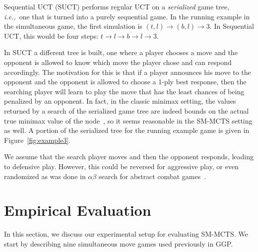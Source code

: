 \documentclass[conference]{IEEEtran}
\newcommand{\ie}{{\it i.e.,}~}
\begin{document}
Sequential UCT (SUCT) performs regular UCT on a {\it serialized} game tree, \ie one that is turned into a 
purely sequential game. 
In the running example in the simultaneous game, the first simulation is $(t,l) \rightarrow (b,l) \rightarrow 3$. 
In Sequential UCT, this would be four steps: $t \rightarrow l \rightarrow b \rightarrow l \rightarrow 3$. 

In SUCT a different tree is built, one where a player chooses a move and the opponent is 
allowed to know which move the player chose and can respond accordingly. 
The motivation for this is that if a player
announces his move to the opponent and the opponent is allowed to choose a 1-ply best response, then the searching player
will learn to play the move that has the least chances of being penalized by an opponent. In fact, in the classic 
minimax setting, the values returned by a search of the serialized game tree are indeed bounds on the actual true 
minimax value of the node~\cite[Corollary 4.2]{Bosansky13Using}, so it seems reasonable in the SM-MCTS setting as well. 
A portion of the serialized tree for the running example game is given in Figure~\ref{fig:example3}. 

We assume that the search player moves and then the opponent responds, leading to 
defensive play. However, this could be reversed for aggressive play, or even randomized as was 
done in $\alpha\beta$ search for abstract combat games~\cite{Kovarsky05RAB}.



\section{Empirical Evaluation}
\label{sec:exp}

In this section, we discuss our experimental setup for evaluating SM-MCTS.
We start by describing nine simultaneous move games used previously in GGP. 

\end{document}
